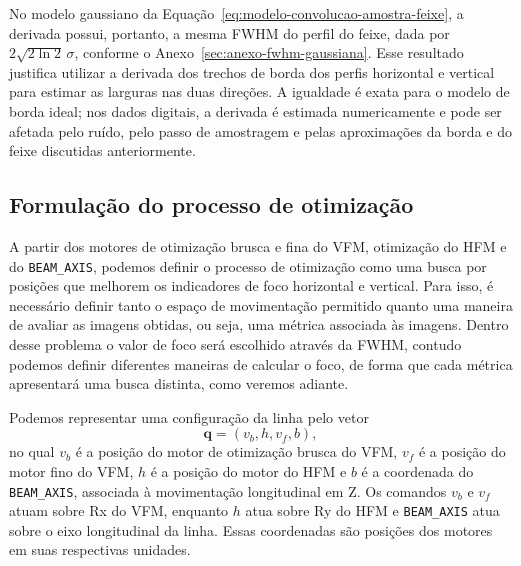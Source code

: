 \documentclass[12pt,a4paper]{article}
\makeatletter
\newcommand{\rotulosecao}[2]{%
    \phantomsection
    \def\@currentlabelname{#2}%
    \label{#1}%
}
\newcounter{anexo}
\makeatother
\begin{document}
No modelo gaussiano da Equação~\ref{eq:modelo-convolucao-amostra-feixe}, a derivada possui, portanto, a mesma FWHM do perfil do feixe, dada por $2\sqrt{2\ln 2}\,\sigma$, conforme o Anexo~\ref{sec:anexo-fwhm-gaussiana}. Esse resultado justifica utilizar a derivada dos trechos de borda dos perfis horizontal e vertical para estimar as larguras nas duas direções. A igualdade é exata para o modelo de borda ideal; nos dados digitais, a derivada é estimada numericamente e pode ser afetada pelo ruído, pelo passo de amostragem e pelas aproximações da borda e do feixe discutidas anteriormente.

\clearpage
{}
\subsection*{Formulação do processo de otimização}
\rotulosecao{sec:otimizacao-foco}{Formulação do processo de otimização}

A partir dos motores de otimização brusca e fina do VFM, otimização do HFM e do \texttt{BEAM\_AXIS}, podemos definir o processo de otimização como uma busca por posições que melhorem os indicadores de foco horizontal e vertical. Para isso, é necessário definir tanto o espaço de movimentação permitido quanto uma maneira de avaliar as imagens obtidas, ou seja, uma métrica associada às imagens. Dentro desse problema o valor de foco será escolhido através da FWHM, contudo podemos definir diferentes maneiras de calcular o foco, de forma que cada métrica apresentará uma busca distinta, como veremos adiante.

Podemos representar uma configuração da linha pelo vetor
\begin{equation}
    \mathbf{q}=(v_b,h,v_f,b),
    \label{eq:configuracao-motores}
\end{equation}
no qual $v_b$ é a posição do motor de otimização brusca do VFM, $v_f$ é a posição do motor fino do VFM, $h$ é a posição do motor do HFM e $b$ é a coordenada do \texttt{BEAM\_AXIS}, associada à movimentação longitudinal em Z. Os comandos $v_b$ e $v_f$ atuam sobre Rx do VFM, enquanto $h$ atua sobre Ry do HFM e \texttt{BEAM\_AXIS} atua sobre o eixo longitudinal da linha. Essas coordenadas são posições dos motores em suas respectivas unidades.
\end{document}
